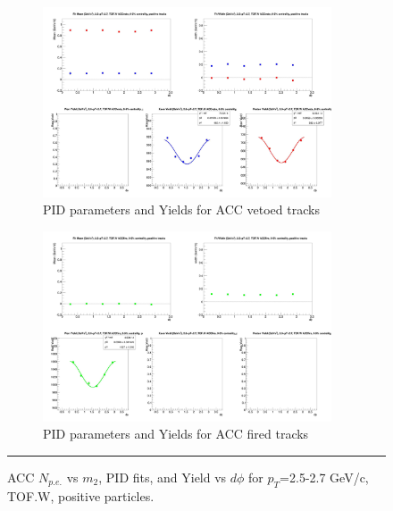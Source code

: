 \begin{figure}[H]
  \ContinuedFloat
  \vspace*{-1cm}
    \begin{subfigure}{1\textwidth}
   \centering
   \includegraphics[width=0.94\textwidth]{hiptfits/pos/fitParams_tof2_cent0_ch1_pT-25-27.jpg}
    \caption{PID parameters and Yields for ACC vetoed tracks}
    \end{subfigure}    
    \begin{subfigure}{1\textwidth}
   \centering
   \includegraphics[width=0.94\textwidth]{hiptfits/pos/fitParams_tof3_cent0_ch1_pT-25-27.jpg}
    \caption{PID parameters and Yields for ACC fired tracks}
    \end{subfigure} 
    \rule{35em}{0.5pt}
  \caption[ACC $N_{p.e.}$ vs $m_2$, PID fits, and Yield vs $d\phi$ for $p_T$=2.5-2.7 GeV/c, TOF.W, negative particles.]{ACC $N_{p.e.}$ vs $m_2$, PID fits, and Yield vs $d\phi$ for $p_T$=2.5-2.7 GeV/c, TOF.W, positive particles.}
  \label{fig:acc25-27pos}
\end{figure}


